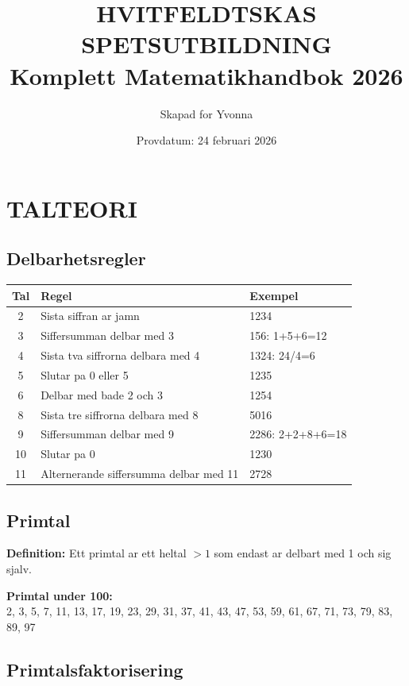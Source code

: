 \documentclass[11pt,a4paper]{article}
\title{\Huge\textbf{HVITFELDTSKAS SPETSUTBILDNING}\\[0.5cm]
\Large Komplett Matematikhandbok 2026}
\author{Skapad for Yvonna}
\date{Provdatum: 24 februari 2026}
\newenvironment{formelbox}{\begin{framed}\color{mainblue}}{\end{framed}}
\begin{document}
\maketitle
\tableofcontents
\newpage

\section{TALTEORI}

\subsection{Delbarhetsregler}

\begin{tabular}{|c|l|l|}
\hline
\textbf{Tal} & \textbf{Regel} & \textbf{Exempel} \\
\hline
2 & Sista siffran ar jamn & 1234 \\
3 & Siffersumman delbar med 3 & 156: 1+5+6=12 \\
4 & Sista tva siffrorna delbara med 4 & 1324: 24/4=6 \\
5 & Slutar pa 0 eller 5 & 1235 \\
6 & Delbar med bade 2 och 3 & 1254 \\
8 & Sista tre siffrorna delbara med 8 & 5016 \\
9 & Siffersumman delbar med 9 & 2286: 2+2+8+6=18 \\
10 & Slutar pa 0 & 1230 \\
11 & Alternerande siffersumma delbar med 11 & 2728 \\
\hline
\end{tabular}

\subsection{Primtal}

\textbf{Definition:} Ett primtal ar ett heltal $> 1$ som endast ar delbart med 1 och sig sjalv.

\begin{formelbox}
\textbf{Primtal under 100:}\\
2, 3, 5, 7, 11, 13, 17, 19, 23, 29, 31, 37, 41, 43, 47, 53, 59, 61, 67, 71, 73, 79, 83, 89, 97
\end{formelbox}

\subsection{Primtalsfaktorisering}
\end{document}
